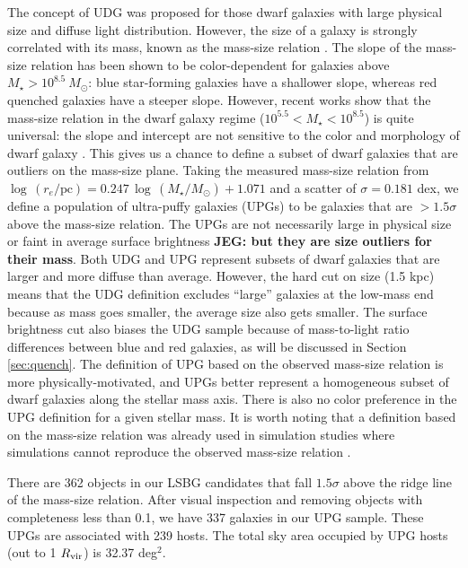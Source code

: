 \documentclass[twocolumn,astrosymb,twocolappendix]{aastex631}
\begin{document}
\begin{CJK*}{UTF8}{gbsn}
\vspace{1em}

The concept of UDG was proposed for those dwarf galaxies with large physical size and diffuse light distribution. However, the size of a galaxy is strongly correlated with its mass, known as the mass-size relation \citep[e.g.,][]{Lange2015}. The slope of the mass-size relation has been shown to be color-dependent for galaxies above $M_\star > 10^{8.5}\ M_\odot$: blue star-forming galaxies have a shallower slope, whereas red quenched galaxies have a steeper slope. However, recent works show that the mass-size relation in the dwarf galaxy regime ($10^{5.5} < M_\star < 10^{8.5}$) is quite universal: the slope and intercept are not sensitive to the color and morphology of dwarf galaxy \citep{ELVES-I}. This gives us a chance to define a subset of dwarf galaxies that are outliers on the mass-size plane. Taking the measured mass-size relation from \citet{ELVES-I} $\log\, (r_e/\mathrm{pc}) = 0.247\, \log\, (M_\star/M_\odot) + 1.071$ and a scatter of $\sigma=0.181$ dex, we define a population of ultra-puffy galaxies (UPGs) to be galaxies that are $>1.5\sigma$ above the mass-size relation. The UPGs are not necessarily large in physical size or faint in average surface brightness {\bf JEG: but they are size outliers for their mass}. Both UDG and UPG represent subsets of dwarf galaxies that are larger and more diffuse than average. However, the hard cut on size (1.5 kpc) means that the UDG definition excludes ``large'' galaxies at the low-mass end because as mass goes smaller, the average size also gets smaller. The surface brightness cut also biases the UDG sample because of mass-to-light ratio differences between blue and red galaxies, as will be discussed in Section \ref{sec:quench}. The definition of UPG based on the observed mass-size relation is more physically-motivated, and UPGs better represent a homogeneous subset of dwarf galaxies along the stellar mass axis. There is also no color preference in the UPG definition for a given stellar mass. It is worth noting that a definition based on the mass-size relation was already used in simulation studies where simulations cannot reproduce the observed mass-size relation \citep[e.g.,][]{Benavides2021}.

There are 362 objects in our LSBG candidates that fall $1.5\sigma$ above the ridge line of the mass-size relation. After visual inspection and removing objects with completeness less than 0.1, we have 337 galaxies in our UPG sample. These UPGs are associated with 239 hosts. The total sky area occupied by UPG hosts (out to 1 $R_{\rm{vir}}$) is 32.37 deg$^{2}$.



\end{CJK*}
\end{document}
